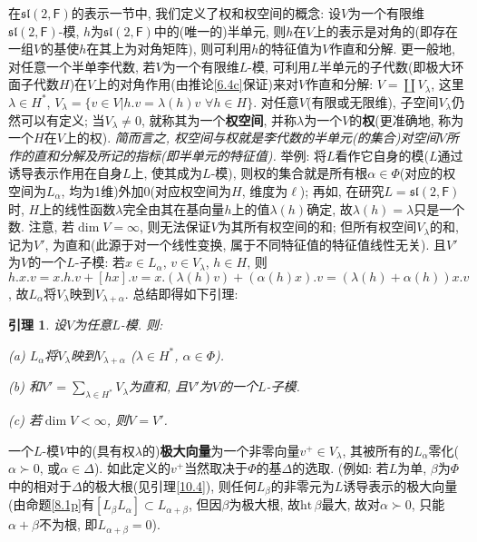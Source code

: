 \documentclass{ctexart}%
\newtheorem{lemma}{引理}
\theoremstyle{definition}
\theoremstyle{remark}
\begin{document}
在$\mathfrak{sl}(2,\mathsf{F})$的表示一节中, 我们定义了权和权空间的概念: 设$V$为一个有限维$\mathfrak{sl}(2,\mathsf{F})$-模, $h$为$\mathfrak{sl}(2,\mathsf{F})$中的(唯一的)半单元, 则$h$在$V$上的表示是对角的(即存在一组$V$的基使$h$在其上为对角矩阵), 则可利用$h$的特征值为$V$作直和分解. 更一般地, 对任意一个半单李代数, 若$V$为一个有限维$L$-模, 可利用$L$半单元的子代数(即极大环面子代数$H$)在$V$上的对角作用(由推论\ref{6.4c}保证)来对$V$作直和分解: $V=\coprod V_\lambda$, 这里$\lambda \in H^*$, $V_\lambda = \{v\in V| h.v=\lambda(h)v\,\, \forall h\in H\}$. 对任意$V$(有限或无限维), 子空间$V_\lambda$仍然可以有定义; 当$V_\lambda \neq 0$, 就称其为一个\textbf{权空间}, 并称$\lambda$为一个$V$的\textbf{权}(更准确地, 称为一个$H$在$V$上的权). \emph{简而言之, 权空间与权就是李代数的半单元(的集合)对空间$V$所作的直和分解及所记的指标(即半单元的特征值).} 举例: 将$L$看作它自身的模($L$通过诱导表示作用在自身$L$上, 使其成为$L$-模), 则权的集合就是所有根$\alpha \in\Phi$(对应的权空间为$L_\alpha$, 均为1维)外加$0$(对应权空间为$H$, 维度为$\ell$); 再如, 在研究$L=\mathfrak{sl}(2,\mathsf{F})$时, $H$上的线性函数$\lambda$完全由其在基向量$h$上的值$\lambda(h)$确定, 故$\lambda(h)=\lambda$只是一个数. 注意, 若$\dim V=\infty$, 则无法保证$V$为其所有权空间的和; 但所有权空间$V_\lambda$的和, 记为$V'$, 为直和(此源于对一个线性变换, 属于不同特征值的特征值线性无关). 且$V'$为$V$的一个$L$-子模: 若$x\in L_\alpha$, $v\in V_\lambda$, $h\in H$, 则$h.x.v=x.h.v+[hx].v= x.(\lambda(h)v)+(\alpha(h)x).v = (\lambda(h)+\alpha(h))x.v$, 故$L_\alpha$将$V_\lambda$映到$V_{\lambda+\alpha}$. 总结即得如下引理:
\begin{lemma}
设$V$为任意$L$-模. 则:

(a) $L_\alpha$将$V_\lambda$映到$V_{\lambda+\alpha}$ ($\lambda\in H^*$, $\alpha \in\Phi$).

(b) 和$V'=\sum_{\lambda\in H^*} V_\lambda$为直和, 且$V'$为$V$的一个$L$-子模.

(c) 若$\dim V< \infty$, 则$V=V'$.
\end{lemma}

一个$L$-模$V$中的(具有权$\lambda$的)\textbf{极大向量}为一个非零向量$v^+\in V_\lambda$, 其被所有的$L_\alpha$零化($\alpha\succ 0$, 或$\alpha\in \Delta$). 如此定义的$v^+$当然取决于$\Phi$的基$\Delta$的选取. (例如: 若$L$为单, $\beta$为$\Phi$中的相对于$\Delta$的极大根(见引理\ref{10.4}), 则任何$L_\beta$的非零元为$L$诱导表示的极大向量(由命题\ref{8.1p}有$[L_\beta L_\alpha]\subset L_{\alpha+\beta}$, 但因$\beta$为极大根, 故$\mathrm{ht}\, \beta$最大, 故对$\alpha\succ 0$, 只能$\alpha+\beta$不为根, 即$L_{\alpha+\beta}=0$). 
\end{document}
